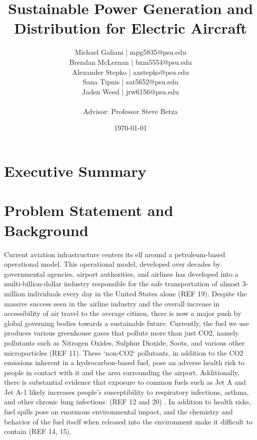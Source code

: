 \documentclass{article}
\title{Sustainable Power Generation and Distribution for Electric Aircraft}
\author{
Michael Galiani | mpg5835@psu.edu\\
Brendan McLernan | bxm5554@psu.edu\\
Alexander Stepko | axstepko@psu.edu\\
Sana Tipnis | sat5652@psu.edu\\
Jaden Weed | jrw6156@psu.edu\\~\\
Advisor: Professor Steve Betza
}
\affil{The Pennsylvania State University}
\date{\today}
\begin{document}
\begin{titlepage}
\maketitle                   %
\end{titlepage}

\tableofcontents %
\newpage

\section{Executive Summary}\label{execSum}
\blindtext

\newpage

\section{Problem Statement and Background}\label{probStatement}

Current aviation infrastructure centers its  elf around a petroleum-based operational model.
This operational model, developed over decades by governmental agencies, airport authorities, and airlines has developed into a multi-billion-dollar industry responsible for the safe transportation of almost 3-million individuals every day in the United States alone (REF 19). 
Despite the massive success seen in  the airline industry and the overall increase in accessibility of air travel to the average citizen, there is now a major push by global governing bodies towards a sustainable future. 
Currently, the fuel we use produces various greenhouse gases that pollute more than just CO2, namely pollutants such as Nitrogen Oxides, Sulphur Dioxide, Soots, and various other microparticles (REF 11). 
These ‘non-CO2‘ pollutants, in addition to the CO2 emissions inherent in a hydrocarbon-based fuel, pose an adverse health risk to people in contact with it and the area surrounding the airport. 
Additionally, there is substantial evidence that exposure to common fuels such as Jet A and Jet A-1 likely increases people’s susceptibility to respiratory infections, asthma, and other chronic lung infections. (REF 12 and 20) . 
In addition to health risks, fuel spills pose an enormous environmental impact, and the chemistry and behavior of the fuel itself when released into the environment make it difficult to contain (REF 14, 15).\par
\end{document}
